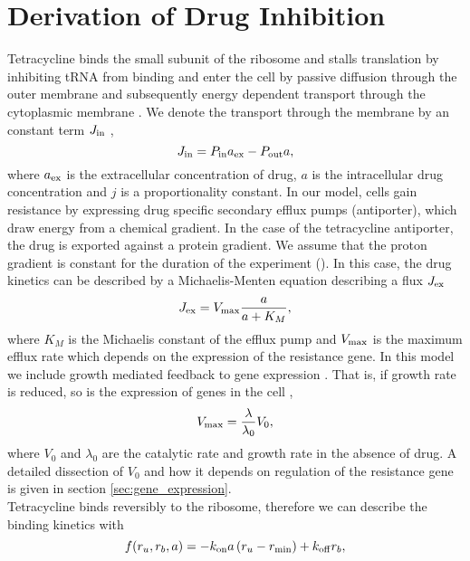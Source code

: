\section{Derivation of Drug Inhibition}
\label{sec:drug_inhib}
Tetracycline binds the small subunit of the ribosome and stalls translation by inhibiting tRNA from binding \cite{chopra2001tetracycline} and enter the cell by passive diffusion through the outer membrane and subsequently energy dependent transport through the cytoplasmic membrane \cite{chopra2001tetracycline}. We denote the transport through the membrane by an constant term $J_{\mathrm{in}}$ ,
\begin{equation}
    J_{\mathrm{in}} = P_{\mathrm{in}} a_{\mathrm{ex}} - P_{\mathrm{out}} a,
\end{equation}
where $a_{\mathrm{ex}}$ is the extracellular concentration of drug, $a$ is the intracellular drug concentration and $j$ is a proportionality constant. In our model, cells gain resistance by expressing drug specific secondary efflux pumps (antiporter), which draw energy from a chemical gradient. In the case of the tetracycline antiporter, the drug is exported against a protein gradient. We assume that the proton gradient is constant for the duration of the experiment (). In this case, the drug kinetics can be described by a Michaelis-Menten equation describing a flux $J_{\mathrm{ex}}$
\begin{equation}
J_{\mathrm{ex}} = V_{\mathrm{max}} {a \over a+K_M},
\end{equation}
where $K_M$ is the Michaelis constant of the efflux pump and $V_{\mathrm{max}}$ is the maximum efflux rate which depends on the expression of the resistance gene. In this model we include growth mediated feedback to gene expression \cite{Deris2013}. That is, if growth rate is reduced, so is the expression of genes in the cell \cite{belliveau2021fundamental},
\begin{equation}
V_{\mathrm{max}} = {\lambda\over\lambda_0} V_0,
\end{equation}
where $V_0$ and $\lambda_0$ are the catalytic rate and growth rate in the absence of drug. A detailed dissection of $V_0$ and how it depends on regulation of the resistance gene is given in section \ref{sec:gene_expression}.\\
Tetracycline binds reversibly to the ribosome, therefore we can describe the binding kinetics with
\begin{equation}
    f(r_u, r_b, a) = -k_{\mathrm{on}}a\,(r_u-r_{\mathrm{min}}) + k_{\mathrm{off}} r_b,
\end{equation}
